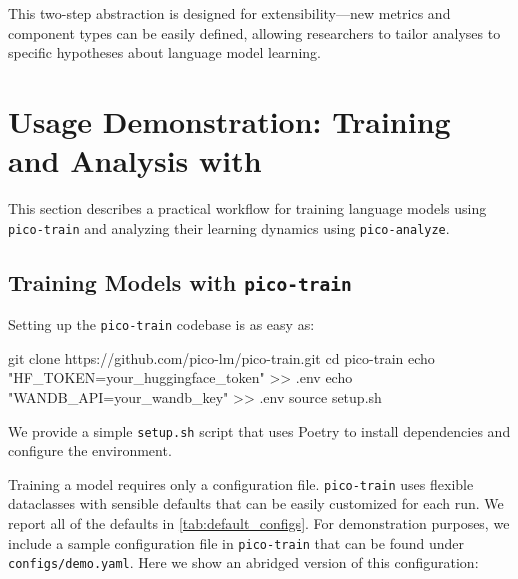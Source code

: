 This two-step abstraction is designed for extensibility—new metrics and component types can be easily defined, allowing researchers to tailor analyses to specific hypotheses about language model learning. 


\section{Usage Demonstration: Training and Analysis with \picolarge}

This section describes a practical workflow for training language models using \texttt{pico-train} and analyzing their learning dynamics using \texttt{pico-analyze}.

\subsection{Training Models with \texttt{pico-train}}

Setting up the \texttt{pico-train} codebase is as easy as:

\begin{center}
    \begin{codelisting}
        git clone https://github.com/pico-lm/pico-train.git
        cd pico-train
        echo "HF_TOKEN=your_huggingface_token" >> .env
        echo "WANDB_API=your_wandb_key" >> .env
        source setup.sh
    \end{codelisting}
\end{center}

We provide a simple \verb|setup.sh| script that uses Poetry \citep{poetry} to install dependencies and configure the environment.

Training a model requires only a configuration file. \texttt{pico-train} uses flexible dataclasses with sensible defaults that can be easily customized for each run. We report all of the defaults in \cref{tab:default_configs}. For demonstration purposes, we include a sample configuration file in \texttt{pico-train} that can be found under \verb|configs/demo.yaml|. Here we show an abridged version of this configuration:


